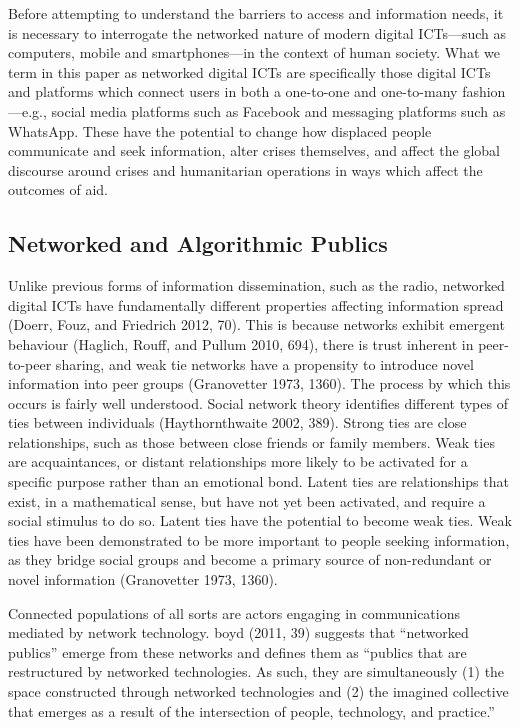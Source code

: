 Before attempting to understand the barriers to access and information
needs, it is necessary to interrogate the networked nature of modern
digital ICTs---such as computers, mobile and smartphones---in the
context of human society. What we term in this paper as networked
digital ICTs are specifically those digital ICTs and platforms which
connect users in both a one-to-one and one-to-many fashion---e.g.,
social media platforms such as Facebook and messaging platforms such as
WhatsApp. These have the potential to change how displaced people
communicate and seek information, alter crises themselves, and affect
the global discourse around crises and humanitarian operations in ways
which affect the outcomes of aid.

\hypertarget{networked-and-algorithmic-publics}{%
\subsection{Networked and Algorithmic
Publics}\label{networked-and-algorithmic-publics}}

Unlike previous forms of information dissemination, such as the radio,
networked digital ICTs have fundamentally different properties affecting
information spread (Doerr, Fouz, and Friedrich 2012, 70). This is
because networks exhibit emergent behaviour (Haglich, Rouff, and Pullum
2010, 694), there is trust inherent in peer-to-peer sharing, and weak
tie networks have a propensity to introduce novel information into peer
groups (Granovetter 1973, 1360). The process by which this occurs is
fairly well understood. Social network theory identifies different types
of ties between individuals (Haythornthwaite 2002, 389). Strong ties are
close relationships, such as those between close friends or family
members. Weak ties are acquaintances, or distant relationships more
likely to be activated for a specific purpose rather than an emotional
bond. Latent ties are relationships that exist, in a mathematical sense,
but have not yet been activated, and require a social stimulus to do so.
Latent ties have the potential to become weak ties. Weak ties have been
demonstrated to be more important to people seeking information, as they
bridge social groups and become a primary source of non-redundant or
novel information (Granovetter 1973, 1360).

Connected populations of all sorts are actors engaging in communications
mediated by network technology. boyd (2011, 39) suggests that
``networked publics'' emerge from these networks and defines them as
``publics that are restructured by networked technologies. As such, they
are simultaneously (1) the space constructed through networked
technologies and (2) the imagined collective that emerges as a result of
the intersection of people, technology, and practice.''

